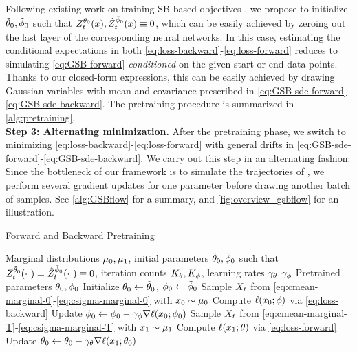 Following existing work on training \acrshort{SB}-based objectives \citep{chen2021likelihood,de2021diffusion, vargas2021solving}, we propose to initialize $\tilde{\theta}_{0}, \tilde{\phi}_{0}$ such that $\SBf[\ctime][\point][\tilde{\paramf}_{0}], \SBb[\ctime][\point][\tilde{\paramb}_{0}] \equiv 0$, which can be easily achieved by zeroing out the last layer of the corresponding neural networks. In this case, estimating the conditional expectations in both \eqref{eq:loss-backward}-\eqref{eq:loss-forward} reduces to simulating \eqref{eq:GSB-forward} \emph{conditioned} on the given start or end data points. Thanks to our closed-form expressions, this can be easily achieved by drawing Gaussian variables with mean and covariance prescribed in  \eqref{eq:GSB-sde-forward}-\eqref{eq:GSB-sde-backward}. The pretraining procedure is summarized in \cref{alg:pretraining}. \\

\textbf{Step 3: Alternating minimization.} After the pretraining phase, we switch to minimizing \eqref{eq:loss-backward}-\eqref{eq:loss-forward} with general drifts in \eqref{eq:GSB-sde-forward}-\eqref{eq:GSB-sde-backward}. We carry out this step in an alternating fashion: Since the bottleneck of our framework is to simulate the trajectories of , we perform several gradient updates for one parameter before drawing another batch of samples. See \cref{alg:GSBflow} for a summary, and \cref{fig:overview_gsbflow} for an illustration.

\begin{algorithm}[t]
   \caption{Forward and Backward Pretraining}
   \label{alg:pretraining}
\begin{algorithmic}
    Marginal distributions $\mu_0, \mu_1$, initial parameters $\tilde{\theta}_{0}, \tilde{\phi}_{0}$ such that $\SBf[\ctime][\cdot\ ][\tilde{\paramf}_0] = \SBb[\ctime][\cdot\ ][\tilde{\paramb}_0] \equiv 0$, iteration counts $K_{\theta}, K_{\phi}$, learning rates $\gamma_{\theta},\gamma_{\phi}$ %
    Pretrained parameters $\theta_0,\phi_0$
   \STATE Initialize $\theta_0 \leftarrow \tilde{\theta}_0$, $\phi_0 \leftarrow \tilde{\phi}_0$
   \STATE Sample $X_{ t }$ from \eqref{eq:cmean-marginal-0}-\eqref{eq:csigma-marginal-0} with $x_0 \sim \mu_0$
   \STATE Compute $\lossb$ via \eqref{eq:loss-backward}
   \STATE Update $\paramb_0 \subs \paramb_0 - \lrb\nabla \lossb[\point_0][\paramb_0]$
   \ENDFOR
   \STATE Sample $X_{ t }$ from \eqref{eq:cmean-marginal-T}-\eqref{eq:csigma-marginal-T} with $x_1 \sim \mu_1$
   \STATE Compute $\lossf$ via \eqref{eq:loss-forward}
   \STATE Update $\paramf_0 \subs \paramf_0 -\lrf \nabla \lossf[\point_\horizon][\paramf_0]$
   \ENDFOR
\end{algorithmic}
\end{algorithm}


